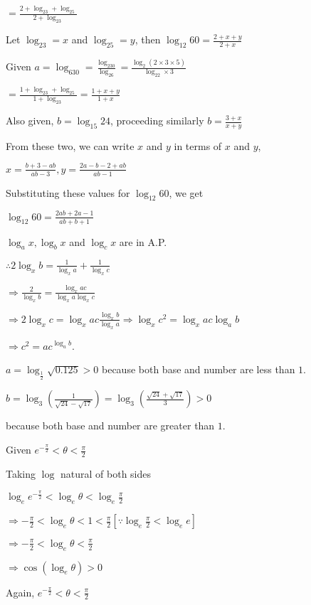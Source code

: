   $= \frac{2 + \log_23 + \log_25}{2 + \log_23}$

  Let $\log_23 = x$ and $\log_25 = y$, then $\log_{12}60 = \frac{2 + x + y}{2 + x}$

  Given $a = \log_630 = \frac{\log_230}{\log_26} = \frac{\log_2(2\times3\times5)}{\log_22\times 3}$

  $= \frac{1 + \log_23 + \log_25}{1 + \log_23} = \frac{1 + x + y}{1 + x}$

  Also given, $b = \log_{15}24$, proceeding similarly $b = \frac{3 + x}{x + y}$

  From these two, we can write $x$ and $y$ in terms of $x$ and $y$,

  $x = \frac{b + 3 - ab}{ab -3}, y = \frac{2a - b - 2 + ab}{ab - 1}$

  Substituting these values for $\log_{12}60$, we get

  $\log_{12}60 = \frac{2ab + 2a - 1}{ab + b + 1}$
\item $\log_ax, \log_bx$ and $\log_cx$ are in A.P.

  $\therefore 2\log_xb = \frac{1}{\log_xa} + \frac{1}{\log_xc}$

  $\Rightarrow \frac{2}{\log_xb} = \frac{\log_xac}{\log_xa\log_xc}$

  $\Rightarrow 2\log_xc = \log_xac\frac{\log_xb}{\log_xa} \Rightarrow \log_xc^2 = \log_xac\log_ab$

  $\Rightarrow c^2 = ac^{\log_ab}$.
\item $a = \log_{\tfrac{1}{2}}\sqrt{0.125} > 0$ because both base and number are less than $1$.

  $b = \log_3\left(\frac{1}{\sqrt{24} - \sqrt{17}}\right) = \log_3\left(\frac{\sqrt{24} + \sqrt{17}}{3}\right) > 0$

  because both base and number are greater than $1$.
\item Given $e^{-\tfrac{\pi}{2}} < \theta < \frac{\pi}{2}$

  Taking $\log$ natural of both sides

  $\log_ee^{-\tfrac{\pi}{2}} < \log_e\theta < \log_e\frac{\pi}{2}$

  $\Rightarrow -\frac{\pi}{2} < \log_e\theta < 1 < \frac{\pi}{2}\left[\because \log_e\tfrac{\pi}{2} < \log_ee\right]$

  $\Rightarrow -\frac{\pi}{2} < \log_e\theta < \frac{\pi}{2}$

  $\Rightarrow \cos(\log_e\theta) > 0$

  Again, $e^{-\tfrac{\pi}{2}} < \theta < \frac{\pi}{2}$

